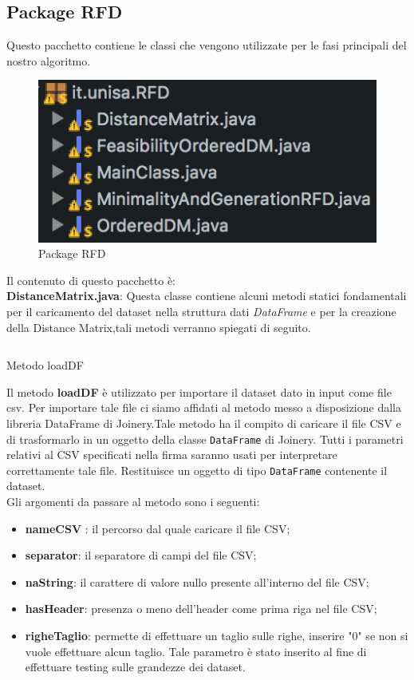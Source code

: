 \subsection{Package RFD}
Questo pacchetto contiene le classi che vengono utilizzate per le fasi principali del nostro algoritmo.\\
\begin{figure}[H]
	\centering
	\includegraphics{Immagini/PackageRFD.png}
	\caption{Package RFD}
	\label{fig:Package RFD}
\end{figure}
Il contenuto di questo pacchetto è:\\
\textbf{DistanceMatrix.java}:
Questa classe contiene alcuni metodi statici fondamentali per il caricamento del dataset nella struttura dati \emph{DataFrame} e per la creazione della Distance Matrix,tali metodi verranno spiegati di seguito.
\begin{listing}[H]
	\inputminted[]{java}{Codici/loadDF.java}
	\caption{Metodo loadDF}
	\label{Code:1}
\end{listing}
Il metodo \textbf{loadDF} è utilizzato per importare il dataset dato in input come file csv.
Per importare tale file ci siamo affidati al metodo messo a disposizione dalla libreria DataFrame di Joinery.Tale metodo ha il compito di caricare il file CSV e di trasformarlo in un oggetto della classe \texttt{DataFrame} di Joinery. Tutti i parametri relativi al CSV specificati nella firma saranno usati per interpretare correttamente tale file. Restituisce un oggetto di tipo \texttt{DataFrame} contenente il dataset. \\
Gli argomenti da passare al metodo sono i seguenti:
\begin{itemize}
	\item \textbf{nameCSV} : il percorso dal quale caricare il file CSV;
	\item \textbf{separator}:  il separatore di campi del file CSV;
	\item \textbf{naString}: il carattere di valore nullo presente all'interno del file CSV;
	\item \textbf{hasHeader}: presenza o meno dell'header come prima riga nel file CSV;
	\item \textbf{righeTaglio}: permette di effettuare un taglio sulle righe, inserire "0" se non si vuole effettuare alcun taglio.
	Tale parametro è stato inserito al fine di effettuare testing sulle grandezze dei dataset.
\end{itemize}
